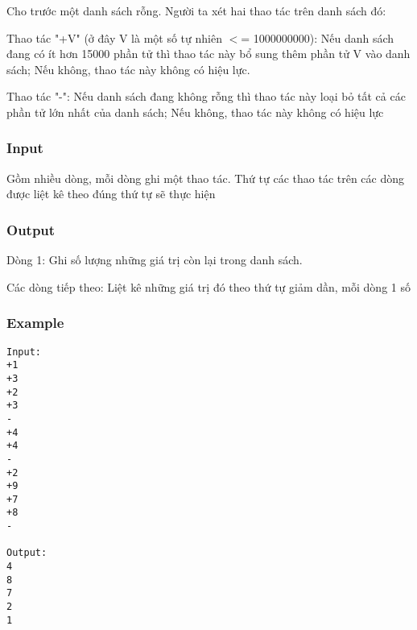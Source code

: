 



   Cho trước một danh sách rỗng. Người ta xét hai thao tác  trên danh sách đó:  

   Thao tác "+V" (ở đây V là một số tự nhiên $<$= 1000000000): Nếu danh sách đang có ít hơn 15000 phần tử thì thao tác này bổ sung thêm phần tử V vào danh sách; Nếu không, thao tác này không có hiệu lực.  

   Thao tác "-": Nếu danh sách đang không rỗng thì thao tác này loại bỏ tất cả các phần tử lớn nhất của danh sách; Nếu không, thao tác này không có hiệu lực  

\subsubsection{   Input  }

   Gồm nhiều dòng, mỗi dòng ghi một thao tác. Thứ tự các thao tác trên các dòng được liệt kê theo đúng thứ tự sẽ thực hiện  

\subsubsection{   Output  }

   Dòng 1: Ghi số lượng những giá trị còn lại trong danh sách.  

   Các dòng tiếp theo: Liệt kê những giá trị đó theo thứ tự giảm dần, mỗi dòng 1 số  

\subsubsection{   Example  }
\begin{verbatim}
Input:
+1
+3
+2
+3
-
+4
+4
-
+2
+9
+7
+8
-

Output:
4
8 
7 
2 
1 

\end{verbatim}